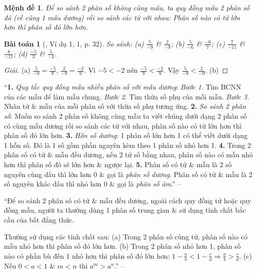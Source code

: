 \documentclass{article}
\newtheorem{baitoan}{Bài toán}
\newtheorem{menhde}{Mệnh đề}
\begin{document}
\begin{menhde}
	Để so sánh 2 phân số không cùng mẫu, ta quy đồng mẫu 2 phân số đó (về cùng 1 mẫu dương) rồi so sánh các tử với nhau: Phân số nào có tử lớn hơn thì phân số đó lớn hơn.
\end{menhde}

\begin{baitoan}[\cite{SGK_Toan_7_Canh_Dieu_tap_2}, Ví dụ 1, 1, p. 32]
	 So sánh: (a) $\frac{5}{-9}$ \& $\frac{2}{-9}$; (b) $\frac{5}{-6}$ \& $\frac{-6}{7}$; (c) $\frac{7}{-11}$ \& $\frac{8}{-11}$; (d) $\frac{-5}{3}$ \& $\frac{5}{-4}$.
\end{baitoan}

\begin{proof}[Giải]
	(a) $\frac{5}{-9} = \frac{-5}{9}$, $\frac{2}{-9} = \frac{-2}{9}$. Vì $-5 < -2$ nên $\frac{-5}{9} < \frac{-2}{9}$. Vậy $\frac{5}{-9} < \frac{2}{-9}$. (b) 
\end{proof}




``\textbf{1.} \textit{Quy tắc quy đồng mẫu nhiều phân số với mẫu dương}: \textit{Bước 1.} Tìm BCNN của các mẫu để làm mẫu chung. \textit{Bước 2.} Tìm thừa số phụ của mỗi mẫu. \textit{Bước 3.} Nhân tử \& mẫu của mỗi phân số với thừa số phụ tương ứng. \textbf{2.} \textit{So sánh 2 phân số}: Muốn so sánh 2 phân số không cùng mẫu ta viết chúng dưới dạng 2 phân số có cùng mẫu dương rồi so sánh các tử với nhau, phân số nào có tử lớn hơn thì phân số đó lớn hơn. \textbf{3.} \textit{Hỗn số dương}: 1 phân số lớn hơn 1 có thể viết dưới dạng 1 hỗn số. Đó là 1 số gồm phần nguyên kèm theo 1 phân số nhỏ hơn 1. \textbf{4.} Trong 2 phân số có tử \& mẫu đều dương, nếu 2 tử số bằng nhau, phân số nào có mẫu nhỏ hơn thì phân số đó sẽ lớn hơn \& ngược lại. \textbf{5.} Phân số có tử \& mẫu là 2 số nguyên cùng dấu thì lớn hơn 0 \& gọi là \textit{phân số dương}. Phân số có tử \& mẫu là 2 số nguyên khác dấu thì nhỏ hơn 0 \& gọi là \textit{phân số âm}.'' -- \cite[Chap. III, \S2, p. 48]{Tuyen_Toan_6}

``Để so sánh 2 phân số có tử \& mẫu đều dương, ngoài cách quy đồng tử hoặc quy đồng mẫu, người ta thường dùng 1 phân số trung gian \& sử dụng tính chất bắc cầu của bất đẳng thức.

Thường sử dụng các tính chất sau: (a) Trong 2 phân số cùng tử, phân số nào có mẫu nhỏ hơn thì phân số đó lớn hơn. (b) Trong 2 phân số nhỏ hơn 1, phân số nào có phần bù đến 1 nhỏ hơn thì phân số đó lớn hơn: $1 - \frac{a}{b} < 1 - \frac{c}{d}\Rightarrow\frac{a}{b} > \frac{c}{d}$. (c) Nếu $0 < a < 1$ \& $m < n$ thì $a^m > a^n$.'' -- \cite[Chap. 1, \S2, p. 8]{Binh_Toan_6_tap_2}
\end{document}
